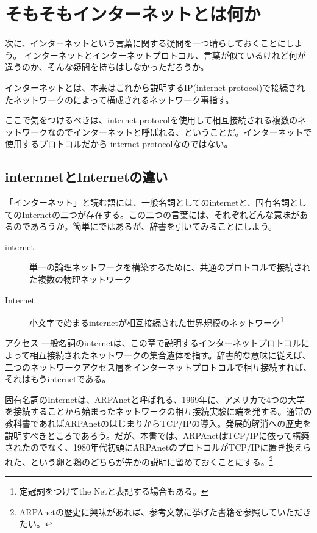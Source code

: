 \section{そもそもインターネットとは何か}

次に、インターネットという言葉に関する疑問を一つ晴らしておくことにしよう。
インターネットとインターネットプロトコル、言葉が似ているけれど何が違うのか、そんな疑問を持ちはしなかっただろうか。

インターネットとは、本来はこれから説明するIP(internet protocol)で接続されたネットワークのによって構成されるネットワーク事指す。

ここで気をつけるべきは、internet protocolを使用して相互接続される複数のネットワークなのでインターネットと呼ばれる、ということだ。インターネットで使用するプロトコルだから internet protocolなのではない。

\subsection{internnetとInternetの違い}

「インターネット」と読む語には、一般名詞としてのinternetと、固有名詞としてのInternetの二つが存在する。この二つの言葉には、それぞれどんな意味があるのであろうか。簡単にではあるが、辞書を引いてみることにしよう。

\begin{description}
\item[internet]単一の論理ネットワークを構築するために、共通のプロトコルで接続された複数の物理ネットワーク
\item[Internet]小文字で始まるinternetが相互接続された世界規模のネットワーク\footnote{定冠詞をつけてthe Netと表記する場合もある。}
\end{description}
アクセス
一般名詞のinternetは、この章で説明するインターネットプロトコルによって相互接続されたネットワークの集合遺体を指す。辞書的な意味に従えば、二つのネットワークアクセス層をインターネットプロトコルで相互接続すれば、それはもうinternetである。

固有名詞のInternetは、ARPAnetと呼ばれる、1969年に、アメリカで4つの大学を接続することから始まったネットワークの相互接続実験に端を発する。通常の教科書であればARPAnetのはじまりからTCP/IPの導入。発展的解消への歴史を説明すべきところであろう。だが、本書では、ARPAnetはTCP/IPに依って構築されたのでなく、1980年代初頭にARPAnetのプロトコルがTCP/IPに置き換えられた、という卵と鶏のどちらが先かの説明に留めておくことにする。\footnote{ARPAnetの歴史に興味があれば、参考文献に挙げた書籍を参照していただきたい。}




